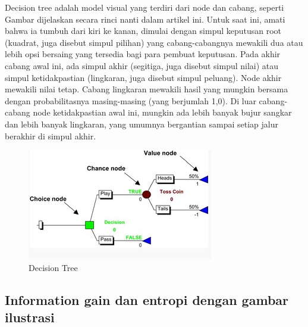 \par Decision tree adalah model visual yang terdiri dari node dan cabang, seperti Gambar dijelaskan secara rinci nanti dalam artikel ini. Untuk saat ini, amati bahwa ia tumbuh dari kiri ke kanan, dimulai dengan simpul keputusan root (kuadrat, juga disebut simpul pilihan) yang cabang-cabangnya mewakili dua atau lebih opsi bersaing yang tersedia bagi para pembuat keputusan. Pada akhir cabang awal ini, ada simpul akhir (segitiga, juga disebut simpul nilai) atau simpul ketidakpastian (lingkaran, juga disebut simpul peluang). Node akhir mewakili nilai tetap. Cabang lingkaran mewakili hasil yang mungkin bersama dengan probabilitasnya masing-masing (yang berjumlah 1,0). Di luar cabang-cabang node ketidakpastian awal ini, mungkin ada lebih banyak bujur sangkar dan lebih banyak lingkaran, yang umumnya bergantian sampai setiap jalur berakhir di simpul akhir.

\begin{figure}[ht]
\centering
\includegraphics[scale=0.5]{figures/f6.jpg}
\caption{Decision Tree}
\label{contoh}
\end{figure}

\subsection{Information gain dan entropi dengan gambar ilustrasi}

